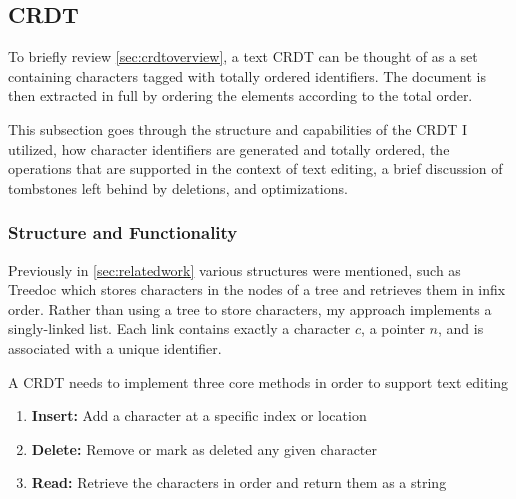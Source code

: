 \documentclass[12pt,a4paper,twoside,openright]{report}
\begin{document}
	
	\subsection{CRDT}
		To briefly review \cref{sec:crdtoverview}, a text CRDT can be thought of as a set containing characters tagged with totally ordered identifiers. The document is then extracted in full by ordering the elements according to the total order. 
		
		This subsection goes through the structure and capabilities of the CRDT I utilized, how character identifiers are generated and totally ordered, the operations that are supported in the context of text editing, a brief discussion of tombstones left behind by deletions, and optimizations.
		
		\subsubsection{Structure and Functionality} \label{sec:crdtstructure}
		Previously in \cref{sec:relatedwork} various structures were mentioned, such as Treedoc which stores characters in the nodes of a tree and retrieves them in infix order. Rather than using a tree to store characters, my approach implements a singly-linked list. Each link contains exactly a character $c$, a pointer $n$, and is associated with a unique identifier.
		
		A CRDT needs to implement three core methods in order to support text editing
		\begin{enumerate}
			\item \textbf{Insert:} Add a character at a specific index or location
			\item \textbf{Delete:} Remove or mark as deleted any given character
			\item \textbf{Read:} Retrieve the characters in order and return them as a string
		\end{enumerate} 
		
\end{document}
